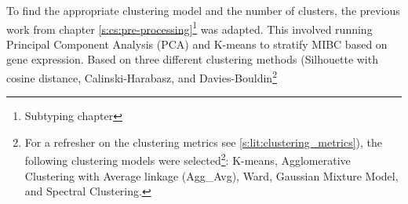 To find the appropriate clustering model and the number of clusters, the previous work from chapter \ref{s:cs:pre-processing}\footnote{Subtyping chapter} was adapted. This involved running Principal Component Analysis (PCA) and K-means to stratify MIBC based on gene expression. Based on three different clustering methods (Silhouette with cosine distance, Calinski-Harabasz, and Davies-Bouldin\footnote{For a refresher on the clustering metrics see \cref{s:lit:clustering_metrics}), the following clustering models were selected\footnote{Other clustering methods explored included DBSCAN, MeanShift, Affinity Propagation, OPTICS, HDBSCAN, and Fuzzy K-means. The models kept are the ones which gave reasonable results; i.e. not clustering the samples only in 1 cluster or 2 clusters. All models used the implementation on Scikit-learn \cite{Scikit-learn_undated-ax}}: K-means, Agglomerative Clustering with Average linkage (Agg\_Avg), Ward, Gaussian Mixture Model, and Spectral Clustering.

}
